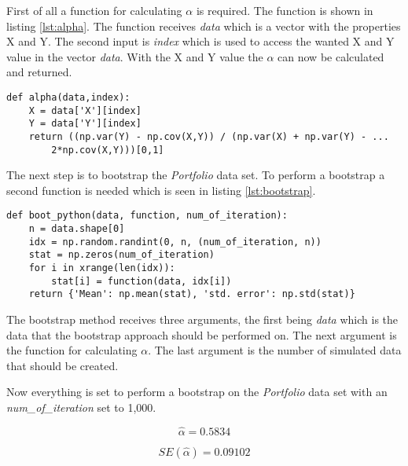 First of all a function for calculating $\alpha$ is required. The function is shown in listing \ref{lst:alpha}. The function receives \emph{data} which is a vector with the properties X and Y. The second input is \emph{index} which is used to access the wanted X and Y value in the vector \emph{data}.
With the X and Y value the $\alpha$ can now be calculated and returned.

\begin{lstlisting}[caption={Function for calculating $\alpha$ in python}, label=lst:alpha, mathescape=true]
def alpha(data,index):
	X = data['X'][index]
	Y = data['Y'][index]
	return ((np.var(Y) - np.cov(X,Y)) / (np.var(X) + np.var(Y) - ...
		2*np.cov(X,Y)))[0,1]
\end{lstlisting}

The next step is to bootstrap the \emph{Portfolio} data set.
To perform a bootstrap a second function is needed which is seen in listing \ref{lst:bootstrap}.

\begin{lstlisting}[caption={Bootstrap function in python}, label=lst:bootstrap, mathescape=true]
def boot_python(data, function, num_of_iteration):
	n = data.shape[0]
	idx = np.random.randint(0, n, (num_of_iteration, n))
	stat = np.zeros(num_of_iteration)
	for i in xrange(len(idx)):
		stat[i] = function(data, idx[i])
	return {'Mean': np.mean(stat), 'std. error': np.std(stat)}
\end{lstlisting}

The bootstrap method receives three arguments, the first being \emph{data} which is the data that the bootstrap approach should be performed on. The next argument is the function for calculating $\alpha$. The last argument is the number of simulated data that should be created.  

Now everything is set to perform a bootstrap on the \emph{Portfolio} data set with an \emph{num\_of\_iteration} set to 1,000.

\begin{equation}
\hat{\alpha} = 0.5834
\end{equation}

\begin{equation}
SE(\hat{\alpha}) = 0.09102
\end{equation}

  
